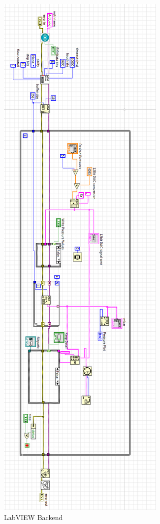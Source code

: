 \begin{figure}[h]
\centering 
\includegraphics[width=01.0\columnwidth]{backend2.PNG} 
\caption[LabVIEW Backend False]{LabVIEW Backend} 
\label{fig:backend2} 
\end{figure}

